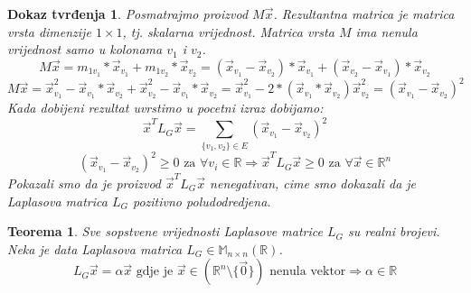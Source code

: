 \documentclass[11pt]{article}
\newtheorem{theorem}{Teorema}
\newtheorem*{custom_proof}{Dokaz tvrđenja}
\begin{document}
\begin{custom_proof}
	Posmatrajmo proizvod $M \vec{x}$. Rezultantna matrica je matrica vrsta dimenzije $1 \times 1$, tj. skalarna vrijednost. Matrica vrsta $M$ ima nenula vrijednost samo u kolonama $v_1$ i $v_2$.
	\[
	M \vec{x} = m_{1 v_1} * \vec{x}_{v_1} + m_{1 v_2} * \vec{x}_{v_2} =  (\vec{x}_{v_1} - \vec{x}_{v_2}) * \vec{x}_{v_1} + (\vec{x}_{v_2} - \vec{x}_{v_1}) * \vec{x}_{v_2} 
	\] 
	\[
	M \vec{x} =  \vec{x}_{v_1}^2 - \vec{x}_{v_1} * \vec{x}_{v_2} + \vec{x}_{v_2}^2 - \vec{x}_{v_1} * \vec{x}_{v_2} = \vec{x}_{v_1}^2 - 2 *(\vec{x}_{v_1} * \vec{x}_{v_2}) \vec{x}_{v_2}^2 = (\vec{x}_{v_1} - \vec{x}_{v_2})^2   
	\] 
	Kada dobijeni rezultat uvrstimo u pocetni izraz dobijamo:
	\[
	  \vec{x}^TL_G\vec{x} = \sum_{\{v_1,v_2\} \in E} (\vec{x}_{v_1} - \vec{x}_{v_2})^2
	\]
	\[
	  (\vec{x}_{v_1} - \vec{x}_{v_2})^2 \geq 0 \text{ za } \forall v_i \in \mathbb{R} \Rightarrow \vec{x}^TL_G\vec{x} \geq 0 \text{ za } \forall \vec{x} \in \mathbb{R}^n
	\]
	Pokazali smo da je proizvod $\vec{x}^TL_G\vec{x}$ nenegativan, cime smo dokazali da je Laplasova matrica $L_G$ pozitivno poludodredjena.
	\end{custom_proof}
	
	\begin{theorem} Sve sopstvene vrijednosti Laplasove matrice $L_G$ su realni brojevi.
	Neka je data Laplasova matrica $L_G \in  \mathbb{M}_{n \times n}(\mathbb{R})$.
	\[
	 L_G\vec{x} = \alpha \vec{x} \text{ gdje je } \vec{x} \in ( \mathbb{R}^n \setminus \{\vec{0}\}) \text{ nenula vektor} \Rightarrow \alpha \in \mathbb{R}
	\]
	\end{theorem}
	
\end{document}
